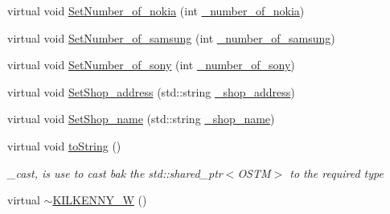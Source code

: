 \begin{DoxyCompactItemize}
\item 
virtual void \hyperlink{class_k_i_l_k_e_n_n_y___w_a3306af7f7a306f5198c6d78e6a54bf8f_a3306af7f7a306f5198c6d78e6a54bf8f}{Set\+Number\+\_\+of\+\_\+nokia} (int \hyperlink{class_k_i_l_k_e_n_n_y___w_a717b79aedec8f4f76269fc0e83bcd2eb_a717b79aedec8f4f76269fc0e83bcd2eb}{\+\_\+number\+\_\+of\+\_\+nokia})
\item 
virtual void \hyperlink{class_k_i_l_k_e_n_n_y___w_ac9ba94018b97ae9be58bde2690965612_ac9ba94018b97ae9be58bde2690965612}{Set\+Number\+\_\+of\+\_\+samsung} (int \hyperlink{class_k_i_l_k_e_n_n_y___w_abf89dc9f1d933e77c3597d2835c692a0_abf89dc9f1d933e77c3597d2835c692a0}{\+\_\+number\+\_\+of\+\_\+samsung})
\item 
virtual void \hyperlink{class_k_i_l_k_e_n_n_y___w_a6edadc355823944f30b94039abed1c9a_a6edadc355823944f30b94039abed1c9a}{Set\+Number\+\_\+of\+\_\+sony} (int \hyperlink{class_k_i_l_k_e_n_n_y___w_a9b12aacf712ccf9e082daf450bbfbe8d_a9b12aacf712ccf9e082daf450bbfbe8d}{\+\_\+number\+\_\+of\+\_\+sony})
\item 
virtual void \hyperlink{class_k_i_l_k_e_n_n_y___w_ac4ec867027aed72ff28bfe667da084cd_ac4ec867027aed72ff28bfe667da084cd}{Set\+Shop\+\_\+address} (std\+::string \hyperlink{class_k_i_l_k_e_n_n_y___w_a278c416a60d21ee6ffa400f6d1348fd5_a278c416a60d21ee6ffa400f6d1348fd5}{\+\_\+shop\+\_\+address})
\item 
virtual void \hyperlink{class_k_i_l_k_e_n_n_y___w_a8670e50802ffeb6a8b4c148c4f5183aa_a8670e50802ffeb6a8b4c148c4f5183aa}{Set\+Shop\+\_\+name} (std\+::string \hyperlink{class_k_i_l_k_e_n_n_y___w_a3ca31fe82131bef3b13759e6d8b9a83b_a3ca31fe82131bef3b13759e6d8b9a83b}{\+\_\+shop\+\_\+name})
\item 
virtual void \hyperlink{class_k_i_l_k_e_n_n_y___w_aea627b4c0efd0f725363556afe1ad849_aea627b4c0efd0f725363556afe1ad849}{to\+String} ()
\begin{DoxyCompactList}\small\item\em \+\_\+cast, is use to cast bak the std\+::shared\+\_\+ptr$<$\+O\+S\+T\+M$>$ to the required type \end{DoxyCompactList}\item 
virtual \hyperlink{class_k_i_l_k_e_n_n_y___w_a5b3f84f505c05449d9a7235f25ff3694_a5b3f84f505c05449d9a7235f25ff3694}{$\sim$\+K\+I\+L\+K\+E\+N\+N\+Y\+\_\+W} ()
\end{DoxyCompactItemize}
